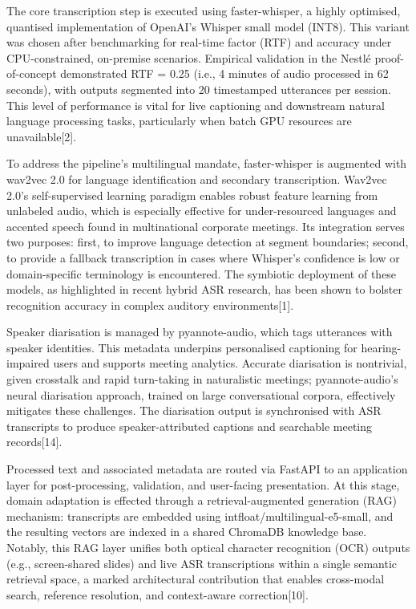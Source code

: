 \documentclass[12pt,a4paper]{article}
\begin{document}
The core transcription step is executed using faster-whisper, a highly optimised, quantised implementation of OpenAI’s Whisper small model (INT8). This variant was chosen after benchmarking for real-time factor (RTF) and accuracy under CPU-constrained, on-premise scenarios. Empirical validation in the Nestlé proof-of-concept demonstrated RTF = 0.25 (i.e., 4 minutes of audio processed in 62 seconds), with outputs segmented into 20 timestamped utterances per session. This level of performance is vital for live captioning and downstream natural language processing tasks, particularly when batch GPU resources are unavailable[2].


To address the pipeline’s multilingual mandate, faster-whisper is augmented with wav2vec 2.0 for language identification and secondary transcription. Wav2vec 2.0’s self-supervised learning paradigm enables robust feature learning from unlabeled audio, which is especially effective for under-resourced languages and accented speech found in multinational corporate meetings. Its integration serves two purposes: first, to improve language detection at segment boundaries; second, to provide a fallback transcription in cases where Whisper’s confidence is low or domain-specific terminology is encountered. The symbiotic deployment of these models, as highlighted in recent hybrid ASR research, has been shown to bolster recognition accuracy in complex auditory environments[1].


Speaker diarisation is managed by pyannote-audio, which tags utterances with speaker identities. This metadata underpins personalised captioning for hearing-impaired users and supports meeting analytics. Accurate diarisation is nontrivial, given crosstalk and rapid turn-taking in naturalistic meetings; pyannote-audio’s neural diarisation approach, trained on large conversational corpora, effectively mitigates these challenges. The diarisation output is synchronised with ASR transcripts to produce speaker-attributed captions and searchable meeting records[14].


Processed text and associated metadata are routed via FastAPI to an application layer for post-processing, validation, and user-facing presentation. At this stage, domain adaptation is effected through a retrieval-augmented generation (RAG) mechanism: transcripts are embedded using intfloat/multilingual-e5-small, and the resulting vectors are indexed in a shared ChromaDB knowledge base. Notably, this RAG layer unifies both optical character recognition (OCR) outputs (e.g., screen-shared slides) and live ASR transcriptions within a single semantic retrieval space, a marked architectural contribution that enables cross-modal search, reference resolution, and context-aware correction[10].
\end{document}
